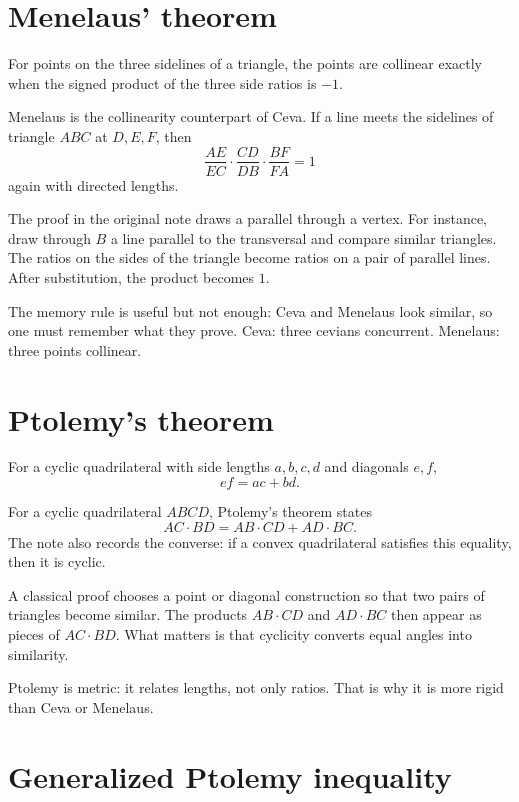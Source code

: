 \section{Menelaus' theorem}

\begin{theorem}
For points on the three sidelines of a triangle, the points are collinear exactly when the signed product of the three side ratios is \(-1\).
\end{theorem}


Menelaus is the collinearity counterpart of Ceva.  If a line meets the sidelines of triangle $ABC$ at $D,E,F$, then
\[
  \frac{AE}{EC}\cdot \frac{CD}{DB}\cdot \frac{BF}{FA}=1
\]
again with directed lengths.

The proof in the original note draws a parallel through a vertex.  For instance, draw through $B$ a line parallel to the transversal and compare similar triangles.  The ratios on the sides of the triangle become ratios on a pair of parallel lines.  After substitution, the product becomes $1$.

The memory rule is useful but not enough: Ceva and Menelaus look similar, so one must remember what they prove.  Ceva: three cevians concurrent.  Menelaus: three points collinear.

\section{Ptolemy's theorem}

\begin{theorem}
For a cyclic quadrilateral with side lengths \(a,b,c,d\) and diagonals \(e,f\),
\[
  ef=ac+bd.
\]
\end{theorem}


For a cyclic quadrilateral $ABCD$, Ptolemy's theorem states
\[
  AC\cdot BD=AB\cdot CD+AD\cdot BC.
\]
The note also records the converse: if a convex quadrilateral satisfies this equality, then it is cyclic.

A classical proof chooses a point or diagonal construction so that two pairs of triangles become similar.  The products $AB\cdot CD$ and $AD\cdot BC$ then appear as pieces of $AC\cdot BD$.  What matters is that cyclicity converts equal angles into similarity.

Ptolemy is metric: it relates lengths, not only ratios.  That is why it is more rigid than Ceva or Menelaus.

\section{Generalized Ptolemy inequality}

